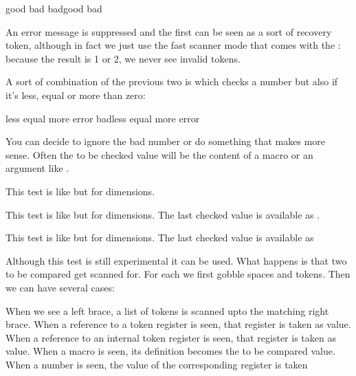 \starttyping[option=TEX]
\or good \else bad \fi
\ifchknum bad\or good \else bad \fi
\stoptyping

An error message is suppressed and the first \type {\or} can be seen as a sort of
recovery token, although in fact we just use the fast scanner mode that comes
with the \type {\ifcase}: because the result is 1 or 2, we never see invalid
tokens.

\stopsectionlevel

\startsectionlevel[title={\tex{ifnumval}}]

A sort of combination of the previous two is \type {\ifnumval} which checks a
number but also if it's less, equal or more than zero:

\starttyping[option=TEX]
\or less \or equal \or more \else error \fi
\ifnumval bad\or less \or equal \or more \else error \fi
\stoptyping

You can decide to ignore the bad number or do something that makes more sense.
Often the to be checked value will be the content of a macro or an argument like
.

\stopsectionlevel

\startsectionlevel[title={\tex{ifcmpdim}}]

This test is like \type {\ifcmpnum} but for dimensions.

\stopsectionlevel

\startsectionlevel[title={\tex{ifchkdim}}]

This test is like \type {\ifchknum} but for dimensions. The last checked value is
available as \type {\lastchknum}.

\stopsectionlevel

\startsectionlevel[title={\tex{ifdimval}}]

This test is like \type {\ifnumval} but for dimensions. The last checked value is
available as \type {\lastchkdim}

\stopsectionlevel

\startsectionlevel[title={\tex{iftok}}]

Although this test is still experimental it can be used. What happens is that
two to be compared  get scanned for. For each we first gobble
spaces and \type {\relax} tokens. Then we can have several cases:

\startitemize[n,packed]
    \startitem
        When we see a left brace, a list of tokens is scanned upto the
        matching right brace.
    \stopitem
    \startitem
        When a reference to a token register is seen, that register is taken as
        value.
    \stopitem
    \startitem
        When a reference to an internal token register is seen, that register is
        taken as value.
    \stopitem
    \startitem
        When a macro is seen, its definition becomes the to be compared value.
    \stopitem
    \startitem
        When a number is seen, the value of the corresponding register is taken
    \stopitem
\stopitemize

